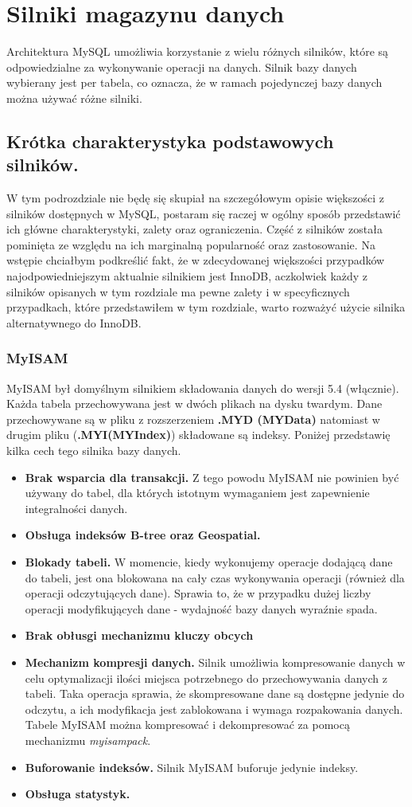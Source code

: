 \section{Silniki magazynu danych}
Architektura MySQL umożliwia korzystanie z wielu różnych silników, które są  odpowiedzialne za wykonywanie operacji na danych. Silnik bazy danych wybierany jest per tabela, co oznacza, że w ramach pojedynczej bazy danych można używać różne silniki.
\subsection{Krótka charakterystyka podstawowych silników.}
W tym podrozdziale nie będę się skupiał na szczegółowym opisie większości z silników dostępnych w MySQL, postaram się raczej w ogólny sposób przedstawić ich główne charakterystyki, zalety oraz ograniczenia. Część z silników została pominięta ze względu na ich marginalną popularność oraz zastosowanie. Na wstępie chciałbym podkreślić fakt, że w zdecydowanej większości przypadków najodpowiedniejszym aktualnie silnikiem jest InnoDB, aczkolwiek każdy z silników opisanych w tym rozdziale ma pewne zalety i w specyficznych przypadkach, które przedstawiłem w tym rozdziale, warto rozważyć użycie silnika alternatywnego do InnoDB.
\subsubsection{MyISAM}
MyISAM był domyślnym silnikiem składowania danych do wersji 5.4 (włącznie). Każda tabela przechowywana jest w dwóch plikach na dysku twardym. Dane przechowywane są w pliku z rozszerzeniem \textbf{.MYD (MYData)}
natomiast w drugim pliku (\textbf{.MYI(MYIndex)}) składowane są indeksy. Poniżej przedstawię kilka cech tego silnika bazy danych. 
\begin{itemize}
	\item \textbf{Brak wsparcia dla transakcji.} Z tego powodu MyISAM nie powinien być używany do tabel, dla których istotnym wymaganiem jest zapewnienie integralności danych.
	\item \textbf{Obsługa indeksów B-tree oraz Geospatial.}
	\item \textbf{Blokady tabeli.}  W momencie, kiedy wykonujemy operacje dodającą dane do tabeli, jest ona blokowana na cały czas wykonywania operacji (również dla operacji odczytujących dane). Sprawia to, że w przypadku dużej liczby operacji modyfikujących dane - wydajność bazy danych wyraźnie spada.
	\item \textbf{Brak obłusgi mechanizmu kluczy obcych}
	\item \textbf{Mechanizm kompresji danych.} Silnik umożliwia kompresowanie danych w celu optymalizacji ilości miejsca potrzebnego do przechowywania danych z tabeli. Taka operacja sprawia, że skompresowane dane są dostępne jedynie do odczytu, a ich modyfikacja jest zablokowana i wymaga rozpakowania danych. Tabele MyISAM można kompresować i dekompresować za pomocą mechanizmu \textit{myisampack}.
	\item \textbf{Buforowanie indeksów.} Silnik MyISAM buforuje jedynie indeksy.
	\item \textbf{Obsługa statystyk.}
\end{itemize}

